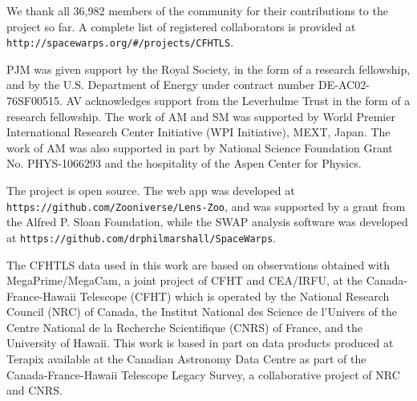 We thank all 36,982 members of the \sw community for their
contributions to the project so far. A complete list of registered
collaborators is provided at \texttt{http://spacewarps.org/\#/projects/CFHTLS}.

PJM was given support by the Royal Society, in the form of a research
fellowship, and by the U.S. Department of Energy under contract number DE-AC02-76SF00515.
%
AV acknowledges support from the Leverhulme Trust in the form of a research
fellowship.
%
The work of AM and SM was supported by World Premier International Research
Center Initiative (WPI Initiative), MEXT, Japan. The work of AM was also supported in
part by National Science Foundation Grant No. PHYS-1066293 and the hospitality
of the Aspen Center for Physics.
%
%

The \sw project is open source.
The web app was developed at \texttt{https://github.com/Zooniverse/Lens-Zoo}, and was supported by a grant from the Alfred P. Sloan Foundation, 
while the SWAP analysis software was developed at
\texttt{https://github.com/drphilmarshall/SpaceWarps}.

The CFHTLS data used in this work are based on observations obtained with
MegaPrime/MegaCam, a joint project of CFHT and CEA/IRFU, at the
Canada-France-Hawaii Telescope (CFHT) which is operated by the National Research
Council (NRC) of Canada, the Institut National des Science de l'Univers of the
Centre National de la Recherche Scientifique (CNRS) of France, and the
University of Hawaii. This work is based in part on data products produced at
Terapix available at the Canadian Astronomy Data Centre as part of the
Canada-France-Hawaii Telescope Legacy Survey, a collaborative project of NRC and
CNRS.
